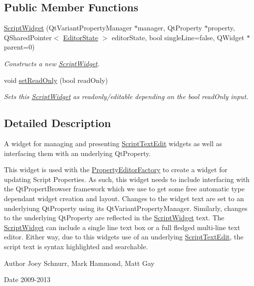\subsection*{Public Member Functions}
\begin{DoxyCompactItemize}
\item 
\hyperlink{class_script_widget_a5d994153c52cfa77daf596a2954675bb}{Script\-Widget} (Qt\-Variant\-Property\-Manager $\ast$manager, Qt\-Property $\ast$property, Q\-Shared\-Pointer$<$ \hyperlink{class_editor_state}{Editor\-State} $>$ editor\-State, bool single\-Line=false, Q\-Widget $\ast$parent=0)
\begin{DoxyCompactList}\small\item\em Constructs a new \hyperlink{class_script_widget}{Script\-Widget}. \end{DoxyCompactList}\item 
\hypertarget{class_script_widget_a1758a4811a13dff36f787e9bd486d310}{void \hyperlink{class_script_widget_a1758a4811a13dff36f787e9bd486d310}{set\-Read\-Only} (bool read\-Only)}\label{class_script_widget_a1758a4811a13dff36f787e9bd486d310}

\begin{DoxyCompactList}\small\item\em Sets this \hyperlink{class_script_widget}{Script\-Widget} as readonly/editable depending on the bool read\-Only input. \end{DoxyCompactList}\end{DoxyCompactItemize}


\subsection{Detailed Description}
A widget for managing and presenting \hyperlink{class_script_text_edit}{Script\-Text\-Edit} widgets as well as interfacing them with an underlying Qt\-Property. 

This widget is used with the \hyperlink{class_property_editor_factory}{Property\-Editor\-Factory} to create a widget for updating Script Properties. As such, this widget needs to include interfacing with the Qt\-Propert\-Browser framework which we use to get some free automatic type dependant widget creation and layout. Changes to the widget text are set to an underlyiung Qt\-Property using its Qt\-Variant\-Property\-Manager. Similarly, changes to the underlying Qt\-Property are reflected in the \hyperlink{class_script_widget}{Script\-Widget} text. The \hyperlink{class_script_widget}{Script\-Widget} can include a single line text box or a full fledged multi-\/line text editor. Either way, due to this widgets use of an underlying \hyperlink{class_script_text_edit}{Script\-Text\-Edit}, the script text is syntax highlighted and searchable. \begin{DoxyAuthor}{Author}
Joey Schnurr, Mark Hammond, Matt Gay 
\end{DoxyAuthor}
\begin{DoxyDate}{Date}
2009-\/2013 
\end{DoxyDate}


